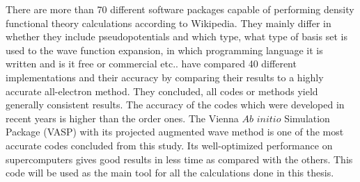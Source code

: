 There are more than 70 different software packages capable of performing density functional theory calculations according to Wikipedia\cite{dft_sws}. They mainly differ in whether they include pseudopotentials and which type, what type of basis set is used to the wave function expansion, in which programming language it is written and is it free or commercial etc.. \citet{Lejaeghereaad3000} have compared 40 different implementations and their accuracy by comparing their results to a highly accurate all-electron method. They concluded, all codes or methods yield generally consistent results. The accuracy of the codes which were developed in recent years is higher than the order ones. The Vienna $Ab$ $initio$ Simulation Package (VASP) \cite{VASP1,VASP2} with its projected augmented wave method is one of the most accurate codes concluded from this study. Its well-optimized performance on supercomputers gives good results in less time as compared with the others. This code will be used as the main tool for all the calculations done in this thesis.